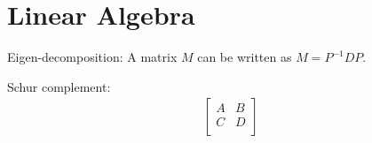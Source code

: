 \documentclass[12pt,a4paper]{article}
\begin{document}
\section{Linear Algebra}

Eigen-decomposition: A matrix $M$ can be written as $M = P^{-1}DP$.


Schur complement:
\begin{align*}
\left[ 
\begin{array}{cc}
  A & B\\
  C & D\\
\end{array}
\right]
\end{align*}


%

\end{document}

